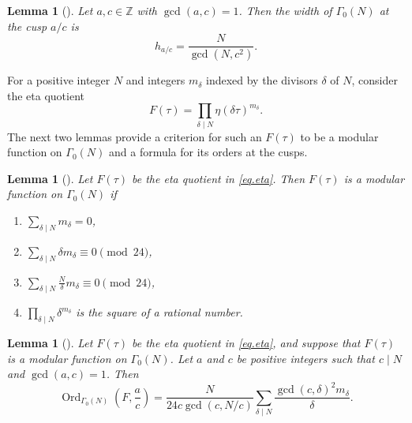 \documentclass{amsart}
\newtheorem{lemma}[theorem]{Lemma}
\theoremstyle{definition}
\DeclareMathOperator{\Ord}{Ord}
\begin{document}
{{\begin{lemma}[{\cite[Lemma~1.1]{Biagioli1989}}]\label{lem.width}
Let $a,c\in\mathbb{Z}$ with $\gcd(a,c)=1$. Then the width of
$\Gamma_{0}(N)$ at the cusp $a/c$ is
\begin{equation*}
h_{a/c}=\frac{N}{\gcd(N,c^{2})}.
\end{equation*}
\end{lemma}

For a positive integer $N$ and integers $m_{\delta}$
indexed by the divisors $\delta$ of $N$, consider the
eta quotient
\begin{equation}\label{eq.eta}
F(\tau)=\prod_{\delta\mid N}\eta(\delta\tau)^{m_{\delta}}.
\end{equation}
The next two lemmas provide a criterion for such an $F(\tau)$ to be a modular function on $\Gamma_{0}(N)$ and a formula for its orders at the cusps.

\begin{lemma}[{\cite[Theorem 1]{Newman1959}}]
\label{lem.newman}
Let $F(\tau)$ be the eta quotient in \eqref{eq.eta}. Then $F(\tau)$ is a
modular function on $\Gamma_{0}(N)$ if 
\begin{enumerate}
\item $\displaystyle\sum_{\delta\mid N}m_{\delta}=0$,
\item $\displaystyle\sum_{\delta\mid N}\delta m_{\delta}
\equiv0\pmod{24}$,
\item $\displaystyle\sum_{\delta\mid N}\frac{N}{\delta}m_{\delta}
\equiv0\pmod{24}$,
\item $\displaystyle\prod_{\delta\mid N}\delta^{m_{\delta}}$
is the square of a rational number.
\end{enumerate}
\end{lemma}

\begin{lemma}[{\cite[Prop~3.2.8]{Ligozat1975}}]
\label{lem.ligorder}
Let $F(\tau)$ be the eta quotient in \eqref{eq.eta}, and suppose that
$F(\tau)$ is a modular function on $\Gamma_{0}(N)$. Let $a$ and $c$ be
positive integers such that $c\mid N$ and $\gcd(a,c)=1$. Then
\begin{equation*}
\Ord_{\Gamma_{0}(N)}\left(F,\frac{a}{c}\right)
=
\frac{N}{24c\gcd(c,N/c)}
\sum_{\delta\mid N}
\frac{\gcd(c,\delta)^{2}m_{\delta}}{\delta}.
\end{equation*}
\end{lemma}



}}
\end{document}
